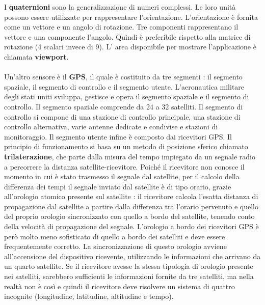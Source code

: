 \documentclass[12pt]{report}
\begin{document}
I \textbf{quaternioni} sono la generalizzazione di numeri complessi. Le loro unità possono essere utilizzate per rappresentare l'orientazione. L'orientazione è fornita come un vettore e un angolo di rotazione. Tre componenti rappresentano il vettore e una componente l'angolo. Quindi è preferibile rispetto alla matrice di rotazione (4 scalari invece di 9). L' area disponibile per mostrare l'applicazione è chiamata \textbf{viewport}. \\\\Un'altro sensore è il \textbf{GPS}, il quale è costituito da tre segmenti : il segmento spaziale, il segmento di controllo e il segmento utente. L'aeronautica militare degli stati uniti sviluppa, gestisce e opera il segmento spaziale e il segmento di controllo. Il segmento spaziale comprende da 24 a 32 satelliti. Il segmento di controllo si compone di una stazione di controllo principale, una stazione di controllo alternativa, varie antenne dedicate e condivise e stazioni di monitoraggio. Il segmento utente infine è composto dai ricevitori GPS. Il principio di funzionamento si basa su un metodo di posizione sferico chiamato \textbf{trilaterazione}, che parte dalla misura del tempo impiegato da un segnale radio a percorrere la distanza satellite-ricevitore. Poiché il ricevitore non conosce il momento in cui è stato trasmesso il segnale dal satellite, per il calcolo della differenza dei tempi il segnale inviato dal satellite è di tipo orario, grazie all'orologio atomico presente sul satellite : il ricevitore calcola l'esatta distanza di propagazione dal satellite a partire dalla differenza tra l'orario pervenuto e quello del proprio orologio sincronizzato con quello a bordo del satellite, tenendo conto della velocità di propagazione del segnale. L'orologio a bordo dei ricevitori GPS è però molto meno sofisticato di quello a bordo dei satelliti e deve essere frequentemente corretto. La sincronizzazione di questo orologio avviene all'accensione del dispositivo ricevente, utilizzando le informazioni che arrivano da un quarto satellite. Se il ricevitore avesse la stessa tipologia di orologio presente nei satelliti, sarebbero sufficienti le informazioni fornite da tre satelliti, ma nella realtà non è così e quindi il ricevitore deve risolvere un sistema di quattro incognite (longitudine, latitudine, altitudine e tempo).
\end{document}
